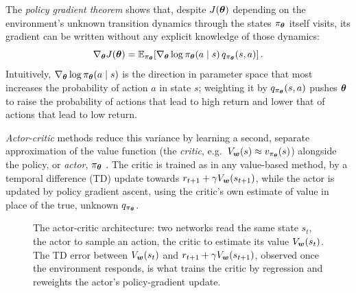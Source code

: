 The \emph{policy gradient theorem} \cite{sutton1999policygradient} shows that, despite $J(\bm{\theta})$ depending on the environment's unknown transition dynamics through the states $\pi_{\bm{\theta}}$ itself visits, its gradient can be written without any explicit knowledge of those dynamics:
\begin{equation}
\nabla_{\bm{\theta}} J(\bm{\theta}) = \mathbb{E}_{\pi_{\bm{\theta}}}\!\left[ \nabla_{\bm{\theta}} \log \pi_{\bm{\theta}}(a\mid s)\, q_{\pi_{\bm{\theta}}}(s,a) \right].
\end{equation}
Intuitively, $\nabla_{\bm{\theta}} \log \pi_{\bm{\theta}}(a\mid s)$ is the direction in parameter space that most increases the probability of action $a$ in state $s$; weighting it by $q_{\pi_{\bm{\theta}}}(s,a)$ pushes $\bm{\theta}$ to raise the probability of actions that lead to high return and lower that of actions that lead to low return.

\emph{Actor-critic} methods reduce this variance by learning a second, separate approximation of the value function (the \emph{critic}, e.g.\ $V_{\bm{w}}(s) \approx v_{\pi_{\bm{\theta}}}(s)$) alongside the policy, or \emph{actor}, $\pi_{\bm{\theta}}$ \cite{konda2000actorcritic}. The critic is trained as in any value-based method, by a temporal difference (TD) update towards $r_{t+1} + \gamma V_{\bm{w}}(s_{t+1})$, while the actor is updated by policy gradient ascent, using the critic's own estimate of value in place of the true, unknown $q_{\pi_{\bm{\theta}}}$.
\vspace{3mm}
\begin{figure}[htbp]
\centering
{}
\caption[Actor and critic networks]{The actor-critic architecture: two networks read the same state $s_t$, the actor to sample an action, the critic to estimate its value $V_{\bm{w}}(s_t)$. The TD error between $V_{\bm{w}}(s_t)$ and $r_{t+1}+\gamma V_{\bm{w}}(s_{t+1})$, observed once the environment responds, is what trains the critic by regression and reweights the actor's policy-gradient update.}
\label{fig:actor-critic}
\end{figure}

